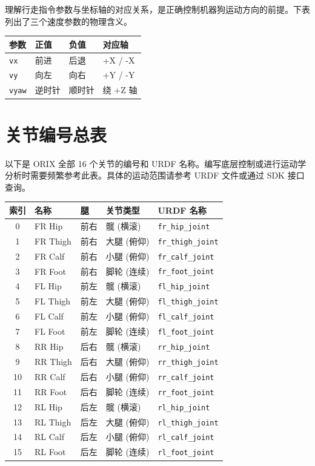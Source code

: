\documentclass[a4paper,11pt,openany]{book}
\begin{document}
理解行走指令参数与坐标轴的对应关系，是正确控制机器狗运动方向的前提。下表列出了三个速度参数的物理含义。

\begin{longtable}{llll}
\toprule
参数 & 正值 & 负值 & 对应轴 \\
\midrule
\endhead
\texttt{vx} & 前进 & 后退 & +X / -X \\
\texttt{vy} & 向左 & 向右 & +Y / -Y \\
\texttt{vyaw} & 逆时针 & 顺时针 & 绕 +Z 轴 \\
\bottomrule
\end{longtable}

\section{关节编号总表}

以下是 ORIX 全部 16 个关节的编号和 URDF 名称。编写底层控制或进行运动学分析时需要频繁参考此表。具体的运动范围请参考 URDF 文件或通过 SDK 接口查询。

\begin{longtable}{cllll}
\toprule
索引 & 名称 & 腿 & 关节类型 & URDF 名称 \\
\midrule
\endhead
0 & FR Hip & 前右 & 髋 (横滚) & \texttt{fr\_hip\_joint} \\
1 & FR Thigh & 前右 & 大腿 (俯仰) & \texttt{fr\_thigh\_joint} \\
2 & FR Calf & 前右 & 小腿 (俯仰) & \texttt{fr\_calf\_joint} \\
3 & FR Foot & 前右 & 脚轮 (连续) & \texttt{fr\_foot\_joint} \\
4 & FL Hip & 前左 & 髋 (横滚) & \texttt{fl\_hip\_joint} \\
5 & FL Thigh & 前左 & 大腿 (俯仰) & \texttt{fl\_thigh\_joint} \\
6 & FL Calf & 前左 & 小腿 (俯仰) & \texttt{fl\_calf\_joint} \\
7 & FL Foot & 前左 & 脚轮 (连续) & \texttt{fl\_foot\_joint} \\
8 & RR Hip & 后右 & 髋 (横滚) & \texttt{rr\_hip\_joint} \\
9 & RR Thigh & 后右 & 大腿 (俯仰) & \texttt{rr\_thigh\_joint} \\
10 & RR Calf & 后右 & 小腿 (俯仰) & \texttt{rr\_calf\_joint} \\
11 & RR Foot & 后右 & 脚轮 (连续) & \texttt{rr\_foot\_joint} \\
12 & RL Hip & 后左 & 髋 (横滚) & \texttt{rl\_hip\_joint} \\
13 & RL Thigh & 后左 & 大腿 (俯仰) & \texttt{rl\_thigh\_joint} \\
14 & RL Calf & 后左 & 小腿 (俯仰) & \texttt{rl\_calf\_joint} \\
15 & RL Foot & 后左 & 脚轮 (连续) & \texttt{rl\_foot\_joint} \\
\bottomrule
\end{longtable}
\end{document}

